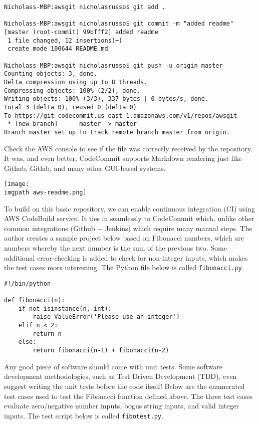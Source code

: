\begin{verbatim}
Nicholass-MBP:awsgit nicholasrusso$ git add .

Nicholass-MBP:awsgit nicholasrusso$ git commit -m "added readme"
[master (root-commit) 99bfff2] added readme
 1 file changed, 12 insertions(+)
 create mode 100644 README.md

Nicholass-MBP:awsgit nicholasrusso$ git push -u origin master
Counting objects: 3, done.
Delta compression using up to 8 threads.
Compressing objects: 100% (2/2), done.
Writing objects: 100% (3/3), 337 bytes | 0 bytes/s, done.
Total 3 (delta 0), reused 0 (delta 0)
To https://git-codecommit.us-east-1.amazonaws.com/v1/repos/awsgit
 * [new branch]      master -> master
Branch master set up to track remote branch master from origin.
\end{verbatim}

Check the AWS console to see if the file was correctly received by the
repository. It was, and even better, CodeCommit supports Markdown rendering
just like Github, Gitlab, and many other GUI-based systems.

    \begin{minipage}[t]{\linewidth}
	  \centering
      \texttt{[image: \\imgpath aws-readme.png]}
    \end{minipage}

To build on this basic repository, we can enable continuous integration (CI)
using AWS CodeBuild service. It ties in seamlessly to CodeCommit which, unlike
other common integrations (Github + Jenkins) which require many manual steps.
The author creates a sample project below based on Fibonacci numbers, which
are numbers whereby the next number is the sum of the previous two. Some
additional error-checking is added to check for non-integer inputs, which
makes the test cases more interesting. The Python file below is called
\verb|fibonacci.py|.

\begin{verbatim}
#!/bin/python

def fibonacci(n):
    if not isinstance(n, int):
        raise ValueError('Please use an integer')
    elif n < 2:
        return n
    else:
        return fibonacci(n-1) + fibonacci(n-2)
\end{verbatim}

Any good piece of software should come with unit tests. Some software
development methodologies, such as Test Driven Development (TDD), even suggest
writing the unit tests before the code itself! Below are the enumerated test
cases used to test the Fibonacci function defined above. The three test cases
evaluate zero/negative number inputs, bogus string inputs, and valid integer
inputs. The test script below is called \verb|fibotest.py|.


